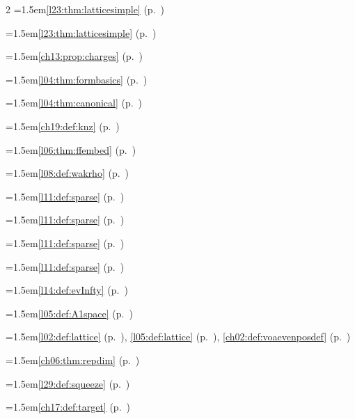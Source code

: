 \begin{multicols}{2}
\hangindent=1.5em\quad \ref{l23:thm:latticesimple} (p.~\pageref{l23:thm:latticesimple})\par
\hangindent=1.5em\quad \ref{l23:thm:latticesimple} (p.~\pageref{l23:thm:latticesimple})\par
\hangindent=1.5em\quad \ref{ch13:prop:charges} (p.~\pageref{ch13:prop:charges})\par
\hangindent=1.5em\quad \ref{l04:thm:formbasics} (p.~\pageref{l04:thm:formbasics})\par
\hangindent=1.5em\quad \ref{l04:thm:canonical} (p.~\pageref{l04:thm:canonical})\par
\hangindent=1.5em\quad \ref{ch19:def:knz} (p.~\pageref{ch19:def:knz})\par
\hangindent=1.5em\quad \ref{l06:thm:ffembed} (p.~\pageref{l06:thm:ffembed})\par
\hangindent=1.5em\quad \ref{l08:def:wakrho} (p.~\pageref{l08:def:wakrho})\par
\hangindent=1.5em\quad \ref{l11:def:sparse} (p.~\pageref{l11:def:sparse})\par
\hangindent=1.5em\quad \ref{l11:def:sparse} (p.~\pageref{l11:def:sparse})\par
\hangindent=1.5em\quad \ref{l11:def:sparse} (p.~\pageref{l11:def:sparse})\par
\hangindent=1.5em\quad \ref{l11:def:sparse} (p.~\pageref{l11:def:sparse})\par
\hangindent=1.5em\quad \ref{l14:def:evInfty} (p.~\pageref{l14:def:evInfty})\par
\hangindent=1.5em\quad \ref{l05:def:A1space} (p.~\pageref{l05:def:A1space})\par
\hangindent=1.5em\quad \ref{l02:def:lattice} (p.~\pageref{l02:def:lattice}), \ref{l05:def:lattice} (p.~\pageref{l05:def:lattice}), \ref{ch02:def:voaevenposdef} (p.~\pageref{ch02:def:voaevenposdef})\par
\hangindent=1.5em\quad \ref{ch06:thm:repdim} (p.~\pageref{ch06:thm:repdim})\par
\hangindent=1.5em\quad \ref{l29:def:squeeze} (p.~\pageref{l29:def:squeeze})\par
\hangindent=1.5em\quad \ref{ch17:def:target} (p.~\pageref{ch17:def:target})\par

\end{multicols}
